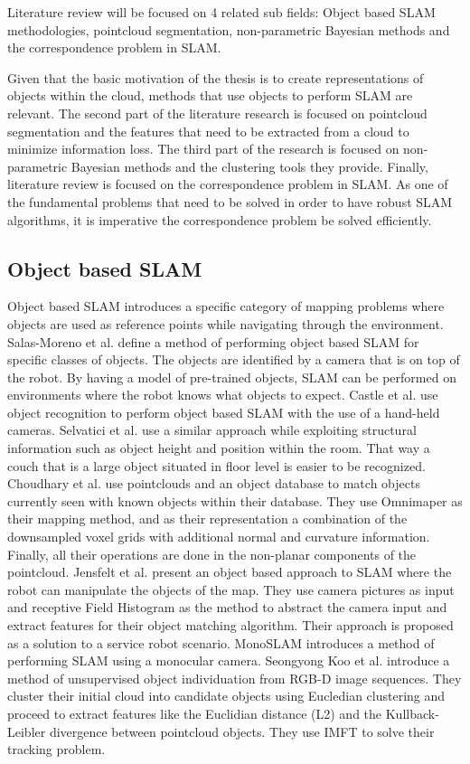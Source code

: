 \documentclass [twoside,hidelinks]{article}
\begin{document}
Literature review will be focused on 4 related sub fields: Object based SLAM methodologies, pointcloud segmentation, non-parametric Bayesian methods and the correspondence problem in SLAM.

Given that the basic motivation of the thesis is to create representations of objects within the cloud, methods that use objects to perform SLAM are relevant. The second part of the literature research is focused on pointcloud segmentation and the features that need to be extracted from a cloud to minimize information loss. The third part of the research is focused on non-parametric Bayesian methods and the clustering tools they provide. Finally, literature review is focused on the correspondence problem in SLAM. As one of the fundamental problems that need to be solved in order to have robust SLAM algorithms, it is imperative the correspondence problem be solved efficiently. 

\subsection{Object based SLAM}


Object based SLAM introduces a specific category of mapping problems where objects are used as reference points while navigating through the environment.
Salas-Moreno et al.\cite{SLAM++} define a method of performing object based SLAM for specific classes of objects. The objects are identified by a camera that is on top of the robot. By having a model of pre-trained objects, SLAM can be performed on environments where the robot knows what objects to expect.
Castle et al. use object recognition to perform object based SLAM with the use of a hand-held cameras. Selvatici et al.\cite{objSLAM} use a similar approach while exploiting structural information such as object height and position within the room. That way a couch that is a large object situated in floor level is easier to be recognized.
Choudhary et al.\cite{objectpointSLAM} use pointclouds and an object database to match objects currently seen with known objects within their database. They use Omnimaper\cite{omnimaper} as their mapping method, and as their representation a combination of the downsampled voxel grids with additional normal and curvature information.  Finally, all their operations are done in the non-planar components of the pointcloud.
Jensfelt et al.\cite{objSLAM} present an object based approach to SLAM where the robot can manipulate the objects of the map. They use camera pictures as input and receptive Field Histogram as the method to abstract the camera input and extract features for their object matching algorithm. Their approach is proposed as a solution to a service robot scenario.
MonoSLAM\cite{monoSLAM} introduces a method of performing SLAM using a monocular camera. 
Seongyong Koo et al.\cite{objectDisc} introduce a method of unsupervised object individuation from RGB-D image sequences. They cluster their initial cloud into candidate objects using Eucledian clustering and proceed to extract features like the Euclidian distance (L2) and the Kullback-Leibler divergence between pointcloud objects. They use IMFT to solve their tracking problem.
\end{document}
